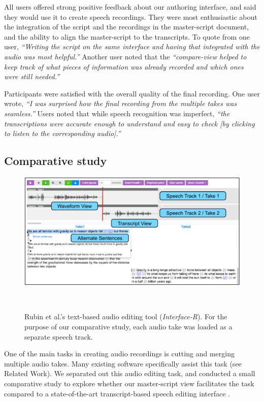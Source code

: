 \begin{mldescription}
All users offered strong positive feedback about our authoring
interface, and said they would use it to create speech recordings. They were most enthusiastic about the integration
of the script and the recordings in the master-script document,
and the ability to align the master-script to the transcripts.
To quote from one user, \textit{``Writing the script on the same interface and having
that integrated with the audio was most helpful.''}  Another user noted
that the \textit{``compare-view helped to keep track of what pieces
of information was already recorded and which ones were still
needed.''} 

Participants were satisfied with the overall quality
of the final recording. One user wrote, \textit{``I was surprised
how the final recording from the multiple takes was seamless.''} Users noted that while speech recognition was imperfect, \textit{``the transcriptions were accurate enough to understand and easy to check [by clicking to listen to the corresponding audio].''}
\end{mldescription}
\subsection{Comparative study}
\begin{figure}[!t]
\centering
  \includegraphics[width=1.0\columnwidth]{figures/interfaceR.pdf}
  \caption{Rubin et al.'s text-based audio editing tool (\textit{Interface-R}). For the purpose of our comparative study, each audio take was loaded as a separate speech track.}~\label{fig:interface-r}
\end{figure}\voicescript

One of the main tasks in creating audio recordings is cutting and merging multiple audio takes. Many existing software specifically assist this task (see Related Work). We separated out this audio editing task, and conducted a small comparative study to explore whether our master-script view facilitates the task compared to a state-of-the-art transcript-based speech editing interface \cite{rubin2013content}. 

